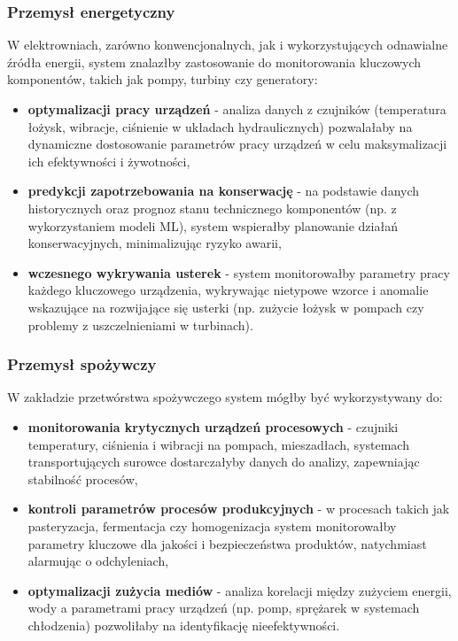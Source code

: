 \subsubsection{Przemysł energetyczny}
\label{subsubsec:przemysl_energetyczny}

W elektrowniach, zarówno konwencjonalnych, jak i wykorzystujących odnawialne źródła energii, system znalazłby zastosowanie do monitorowania kluczowych komponentów, takich jak pompy, turbiny czy generatory:

\begin{itemize}
    \item \textbf{optymalizacji pracy urządzeń} - analiza danych z czujników (temperatura łożysk, wibracje, ciśnienie w układach hydraulicznych) pozwalałaby na dynamiczne dostosowanie
    parametrów pracy urządzeń w celu maksymalizacji ich efektywności i żywotności,
    \item \textbf{predykcji zapotrzebowania na konserwację} - na podstawie danych historycznych oraz prognoz stanu technicznego komponentów (np. z wykorzystaniem modeli ML), system wspierałby
    planowanie działań konserwacyjnych, minimalizując ryzyko awarii,
    \item \textbf{wczesnego wykrywania usterek} - system monitorowałby parametry pracy każdego kluczowego urządzenia, wykrywając nietypowe wzorce i anomalie 
    wskazujące na rozwijające się usterki (np. zużycie łożysk w pompach czy problemy z uszczelnieniami w turbinach).
\end{itemize}

\subsubsection{Przemysł spożywczy}
\label{subsubsec:przemysl_spozywczy}

W zakładzie przetwórstwa spożywczego system mógłby być wykorzystywany do:

\begin{itemize}
    \item \textbf{monitorowania krytycznych urządzeń procesowych} - czujniki temperatury, ciśnienia i wibracji na pompach, mieszadłach, systemach transportujących surowce dostarczałyby danych do analizy, zapewniając stabilność procesów,
    \item \textbf{kontroli parametrów procesów produkcyjnych} - w procesach takich jak pasteryzacja, fermentacja czy homogenizacja system monitorowałby parametry kluczowe dla jakości i bezpieczeństwa produktów, natychmiast alarmując o odchyleniach,
    \item \textbf{optymalizacji zużycia mediów} - analiza korelacji między zużyciem energii, wody a parametrami pracy urządzeń (np. pomp, sprężarek w systemach chłodzenia) pozwoliłaby na identyfikację nieefektywności.
\end{itemize}

